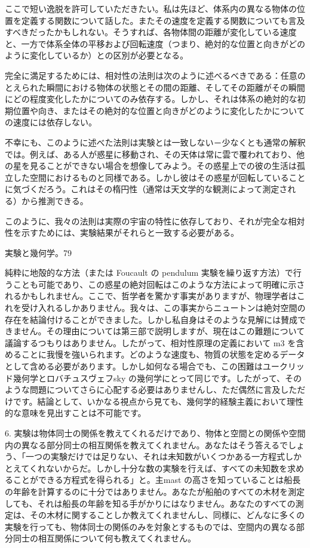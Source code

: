 \documentclass[a4paper,11pt,openany]{ltjsbook}
\begin{document}
ここで短い逸脱を許可していただきたい。私は先ほど、体系内の異なる物体の位置を定義する関数について話した。またその速度を定義する関数についても言及すべきだったかもしれない。そうすれば、各物体間の距離が変化している速度と、一方で体系全体の平移および回転速度（つまり、絶対的な位置と向きがどのように変化しているか）との区別が必要となる。

完全に満足するためには、相対性の法則は次のように述べるべきである：任意のとえられた瞬間における物体の状態とその間の距離、そしてその距離がその瞬間にどの程度変化したかについてのみ依存する。しかし、それは体系の絶対的な初期位置や向き、またはその絶対的な位置と向きがどのように変化したかについての速度には依存しない。

不幸にも、このように述べた法則は実験とは一致しない－少なくとも通常の解釈では。例えば、ある人が惑星に移動され、その天体は常に雲で覆われており、他の星を見ることができない場合を想像してみよう。その惑星上での彼の生活は孤立した空間におけるものと同様である。しかし彼はその惑星が回転していることに気づくだろう。これはその楕円性（通常は天文学的な観測によって測定される）から推測できる。

このように、我々の法則は実際の宇宙の特性に依存しており、それが完全な相対性を示すためには、実験結果がそれらと一致する必要がある。

実験と幾何学。79

純粋に地殻的な方法（または Foucault の pendulum 実験を繰り返す方法）で行うことも可能であり、この惑星の絶対回転はこのような方法によって明確に示されるかもしれません。ここで、哲学者を驚かす事実がありますが、物理学者はこれを受け入れるしかありません。我々は、この事実からニュートンは絶対空間の存在を結論付けることができました。しかし私自身はそのような見解には賛成できません。その理由については第三部で説明しますが、現在はこの難題について議論するつもりはありません。したがって、相対性原理の定義において m3 を含めることに我慢を強いられます。どのような速度も、物質の状態を定めるデータとして含める必要があります。しかし如何なる場合でも、この困難はユークリッド幾何学とロバチュスヴェフsky の幾何学にとって同じです。したがって、そのような問題についてさらに心配する必要はありませんし、ただ偶然に言及しただけです。結論として、いかなる視点から見ても、幾何学的経験主義において理性的な意味を見出すことは不可能です。

6. 実験は物体同士の関係を教えてくれるだけであり、物体と空間との関係や空間内の異なる部分同士の相互関係を教えてくれません。あなたはそう答えるでしょう、「一つの実験だけでは足りない、それは未知数がいくつかある一方程式しかとえてくれないからだ。しかし十分な数の実験を行えば、すべての未知数を求めることができる方程式を得られる」と。主mast の高さを知っていることは船長の年齢を計算するのに十分ではありません。あなたが船舶のすべての木材を測定しても、それは船長の年齢を知る手がかりにはなりません。あなたのすべての測定は、その木材に関することしか教えてくれませんし、同様に、どんなに多くの実験を行っても、物体同士の関係のみを対象とするものでは、空間内の異なる部分同士の相互関係について何も教えてくれません。
\end{document}
